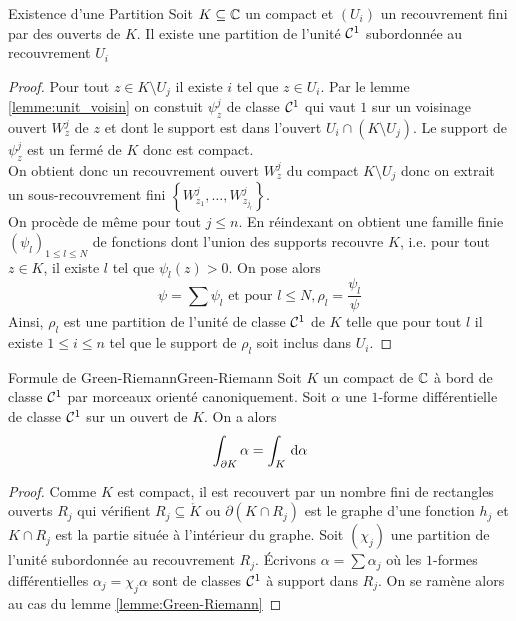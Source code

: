 \documentclass{cours}
\begin{document}
\begin{lemme}{Existence d'une Partition}{}
    Soit $K \subseteq \mathbb{C}$ un compact et $\left(U_{i}\right)$ un recouvrement fini par des ouverts de $K$. Il existe une partition de l'unité $\mathcal{C}^{1}$ subordonnée au recouvrement $U_{i}$
\end{lemme}
\begin{proof}
    Pour tout $z \in K \setminus U_{j}$ il existe $i$ tel que $z \in U_{i}$. Par le lemme \ref{lemme:unit_voisin} on constuit $\psi_{z}^{j}$ de classe $\mathcal{C}^{1}$ qui vaut $1$ sur un voisinage ouvert $W_{z}^{j}$ de $z$ et dont le support est dans l'ouvert $U_{i} \cap \left(K \setminus U_{j}\right)$. Le support de $\psi_{z}^{j}$ est un fermé de $K$ donc est compact. \\
    On obtient donc un recouvrement ouvert $W_{z}^{j}$ du compact $K \setminus U_{j}$ donc on extrait un sous-recouvrement fini $\left\{W_{z_{1}}^{j}, \ldots, W_{z_{j_{l}}}^{j}\right\}$. \\
    On procède de même pour tout $j \leq n$. En réindexant on obtient une famille finie $\left(\psi_{l}\right)_{1 \leq l \leq N}$ de fonctions dont l'union des supports recouvre $K$, i.e. pour tout $z \in K$, il existe $l$ tel que $\psi_{l}\left(z\right) > 0$. On pose alors 
    \begin{equation*}
        \psi = \sum \psi_{l} \text{ et pour } l\leq N, \rho_{l} = \frac{\psi_{l}}{\psi}
    \end{equation*}
    Ainsi, $\rho_{l}$ est une partition de l'unité de classe $\mathcal{C}^{1}$ de $K$ telle que pour tout $l$ il existe $1 \leq i \leq n$ tel que le support de $\rho_{l}$ soit inclus dans $U_{i}$.
\end{proof}

\begin{théorème}{Formule de Green-Riemann}{Green-Riemann}
    Soit $K$ un compact de $\mathbb{C}$ à bord de classe $\mathcal{C}^{1}$ par morceaux orienté canoniquement. Soit $\alpha$ une $1$-forme différentielle de classe $\mathcal{C}^{1}$ sur un ouvert de $K$. On a alors 
    \begin{equation*}
        \int_{\partial K}\alpha = \int_{K}{\rm \, d} \alpha
    \end{equation*}
\end{théorème}
\begin{proof}
    Comme $K$ est compact, il est recouvert par un nombre fini de rectangles ouverts $R_{j}$ qui vérifient $R_{j} \subseteq \mathring{K}$ ou $\partial\left(K \cap R_{j}\right)$ est le graphe d'une fonction $h_{j}$ et $K\cap R_{j}$ est la partie située à l'intérieur du graphe. Soit $\left(\chi_{j}\right)$ une partition de l'unité subordonnée au recouvrement $R_{j}$. Écrivons $\alpha = \sum \alpha_{j}$ où les $1$-formes différentielles $\alpha_{j} = \chi_{j}\alpha$ sont de classes $\mathcal{C}^{1}$ à support dans $R_{j}$. On se ramène alors au cas du lemme \ref{lemme:Green-Riemann}
\end{proof}
\end{document}
